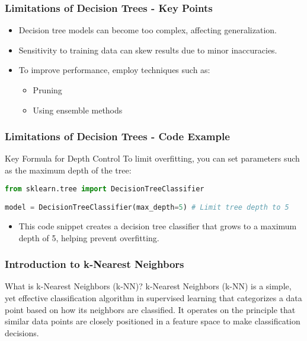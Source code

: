\documentclass[aspectratio=169]{beamer}
\begin{document}
\begin{frame}[fragile]
    \frametitle{Limitations of Decision Trees - Key Points}
    \begin{itemize}
        \item Decision tree models can become too complex, affecting generalization.
        \item Sensitivity to training data can skew results due to minor inaccuracies.
        \item To improve performance, employ techniques such as:
        \begin{itemize}
            \item Pruning
            \item Using ensemble methods
        \end{itemize}
    \end{itemize}
\end{frame}

\begin{frame}[fragile]
    \frametitle{Limitations of Decision Trees - Code Example}
    \begin{block}{Key Formula for Depth Control}
        To limit overfitting, you can set parameters such as the maximum depth of the tree:
    \end{block}
    \begin{lstlisting}[language=Python]
from sklearn.tree import DecisionTreeClassifier

model = DecisionTreeClassifier(max_depth=5) # Limit tree depth to 5
    \end{lstlisting}
    \begin{itemize}
        \item This code snippet creates a decision tree classifier that grows to a maximum depth of 5, helping prevent overfitting.
    \end{itemize}
\end{frame}

\begin{frame}[fragile]
    \frametitle{Introduction to k-Nearest Neighbors}
    \begin{block}{What is k-Nearest Neighbors (k-NN)?}
        k-Nearest Neighbors (k-NN) is a simple, yet effective classification algorithm in supervised learning that categorizes a data point based on how its neighbors are classified. 
        It operates on the principle that similar data points are closely positioned in a feature space to make classification decisions.
    \end{block}
\end{frame}
\end{document}
